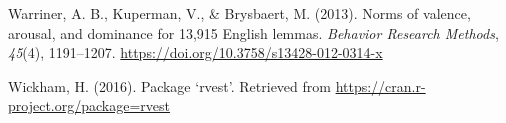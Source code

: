 \documentclass[
  english,
  man,floatsintext]{apa6}
\newlength{\cslhangindent}
\newlength{\cslentryspacingunit} %
\newenvironment{CSLReferences}[2] %
 {%
  \setlength{\parindent}{0pt}
  \ifodd #1
  \let\oldpar\par
  \def\par{\hangindent=\cslhangindent\oldpar}
  \fi
  \setlength{\parskip}{#2\cslentryspacingunit}
 }%
 {}
\begin{document}
\begin{CSLReferences}{1}{0}
\leavevmode{}%
Warriner, A. B., Kuperman, V., \& Brysbaert, M. (2013). {Norms of valence, arousal, and dominance for 13,915 English lemmas}. \emph{Behavior Research Methods}, \emph{45}(4), 1191--1207. \url{https://doi.org/10.3758/s13428-012-0314-x}

\leavevmode{}%
Wickham, H. (2016). {Package `rvest'}. Retrieved from \url{https://cran.r-project.org/package=rvest}

\end{CSLReferences}

\endgroup
\end{document}
